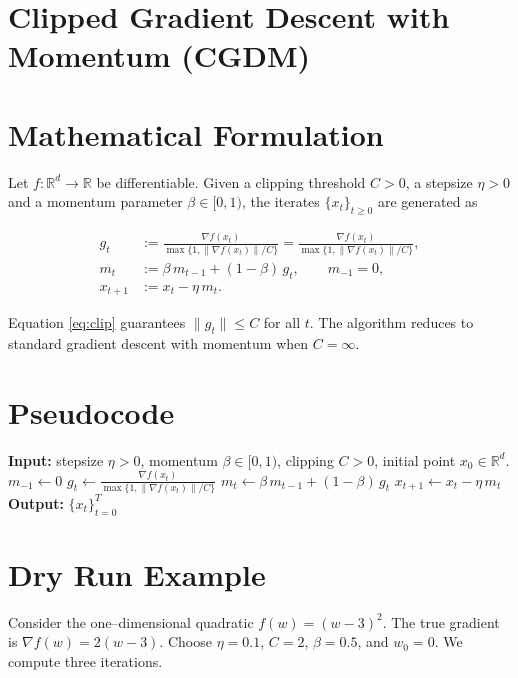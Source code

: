 \documentclass{article}
\newcommand{\clip}[2]{\frac{#1}{\max\{1,\|#1\|/#2\}}}
\newcommand{\R}{\mathbb{R}}
\begin{document}
\section*{Clipped Gradient Descent with Momentum (CGDM)}

\section*{Mathematical Formulation}
Let $f:\R^{d}\rightarrow\R$ be differentiable.  
Given a clipping threshold $C>0$, a stepsize $\eta>0$ and a momentum
parameter $\beta\in[0,1)$, the iterates $\{x_t\}_{t\ge 0}$ are generated as

\begin{align}
    g_t &:= \clip{\nabla f(x_t)}{C}
    =\frac{\nabla f(x_t)}{\max\{1,\|\nabla f(x_t)\|/C\}},\label{eq:clip}\\[4pt]
    m_t &:= \beta\, m_{t-1} + (1-\beta)\, g_t,
    \qquad m_{-1}=0, \label{eq:momentum}\\[4pt]
    x_{t+1} &:= x_t - \eta\, m_t . \label{eq:update}
\end{align}

Equation \eqref{eq:clip} guarantees $\|g_t\|\le C$ for all $t$.  
The algorithm reduces to standard gradient descent with momentum when $C=\infty$.

\section*{Pseudocode}
\begin{algorithm}[h]
\caption{Clipped Gradient Descent with Momentum (CGDM)}
\begin{algorithmic}[1]
\State \textbf{Input:} stepsize $\eta>0$, momentum $\beta\in[0,1)$, clipping $C>0$, 
initial point $x_0\in\R^d$.
\State $m_{-1}\gets 0$
    \State $g_t \gets \displaystyle\frac{\nabla f(x_t)}{\max\{1,\|\nabla f(x_t)\|/C\}}$ 
    \State $m_t \gets \beta\, m_{t-1} + (1-\beta)\, g_t$ 
    \State $x_{t+1} \gets x_t - \eta\, m_t$ 
\EndFor
\State \textbf{Output:} $\{x_t\}_{t=0}^T$
\end{algorithmic}
\end{algorithm}

\section*{Dry Run Example}
Consider the one–dimensional quadratic $f(w)=(w-3)^2$.
The true gradient is $\nabla f(w)=2(w-3)$.  
Choose $\eta=0.1$, $C=2$, $\beta=0.5$, and $w_0=0$.
We compute three iterations.
\end{document}

